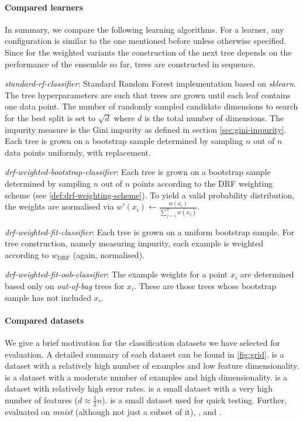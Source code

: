 \documentclass[../main.tex]{subfiles}
\begin{document}
\paragraph{Compared learners} In summary, we compare the following learning algorithms. For a learner, any configuration is similar to the one mentioned before unless otherwise specified. Since for the weighted variants the construction of the next tree depends on the performance of the ensemble so far, trees are constructed in sequence.

\textit{standard-rf-classifier}: Standard Random Forest implementation based on \textit{sklearn}. The tree hyperparameters are such that trees are grown until each leaf contains one data point. The number of randomly sampled candidate dimensions to search for the best split is set to $\sqrt{d}$ where $d$ is the total number of dimensions. The impurity measure is the Gini impurity as defined in section \ref{sec:gini-impurity}. Each tree is grown on a bootstrap sample determined by sampling $n$ out of $n$ data points uniformly, with replacement.

\textit{drf-weighted-bootstrap-classifier}: Each tree is grown on a bootstrap sample determined by sampling $n$ out of $n$ points according to the DRF weighting scheme (see \ref{def:drf-weighting-scheme}). To yield a valid probability distribution, the weights are normalised via $w'(x_i) \gets \frac{w(x_i)}{\sum_{j=1}^n w(x_j)}$.

\textit{drf-weighted-fit-classifier}: Each tree is grown on a uniform bootstrap sample. For tree construction, namely measuring impurity, each example is weighted according to $w_{\text{DRF}}$ (again, normalised).

\textit{drf-weighted-fit-oob-classifier}: The example weights for a point $x_i$ are determined based only on \textit{out-of-bag} trees for $x_i$. These are those trees whose bootstrap sample has not included $x_i$.

\paragraph{Compared datasets} We give a brief motivation for the classification datasets we have selected for evaluation. A detailed summary of each dataset can be found in \ref{fig:grid}.
\cover is a dataset with a relatively high number of examples and low feature dimensionality. \mnist is a dataset with a moderate number of examples and high dimensionality. \diabetes is a dataset with relatively high error rates. \bioresponse is a small dataset with a very high number of features ($d \approx \frac{1}{2}n$). \qsar is a small dataset used for quick testing.
Further, \cite{bernard, xuChen} evaluated on \textit{mnist} (although not just a subset of it), \spambase, \digits and \diabetes.
\end{document}
